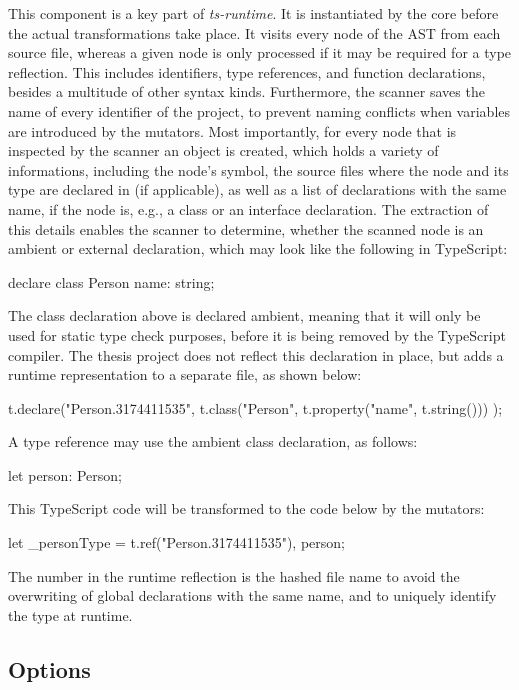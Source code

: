 This component is a key part of \emph{ts-runtime}. It is instantiated by the core before the actual transformations take place. It visits every node of the AST from each source file, whereas a given node is only processed if it may be required for a type reflection. This includes identifiers, type references, and function declarations, besides a multitude of other syntax kinds. Furthermore, the scanner saves the name of every identifier of the project, to prevent naming conflicts when variables are introduced by the mutators. Most importantly, for every node that is inspected by the scanner an object is created, which holds a variety of informations, including the node's symbol, the source files where the node and its type are declared in (if applicable), as well as a list of declarations with the same name, if the node is, e.g., a class or an interface declaration. The extraction of this details enables the scanner to determine, whether the scanned node is an ambient or external declaration, which may look like the following in TypeScript:
\begin{JsCode}[numbers=none]
declare class Person {
  name: string;
}
\end{JsCode}
The class declaration above is declared ambient, meaning that it will only be used for static type check purposes, before it is being removed by the TypeScript compiler. The thesis project does not reflect this declaration in place, but adds a runtime representation to a separate file, as shown below:
\begin{JsCode}[numbers=none]
t.declare("Person.3174411535",
  t.class("Person", t.property("name", t.string()))
);
\end{JsCode}
A type reference may use the ambient class declaration, as follows:
\begin{JsCode}[numbers=none]
let person: Person;
\end{JsCode}
This TypeScript code will be transformed to the code below by the mutators:
\begin{JsCode}[numbers=none]
let _personType = t.ref("Person.3174411535"), person;
\end{JsCode}
The number in the runtime reflection is the hashed file name to avoid the overwriting of global declarations with the same name, and to uniquely identify the type at runtime.

\subsection{Options}
\label{sec:options}

